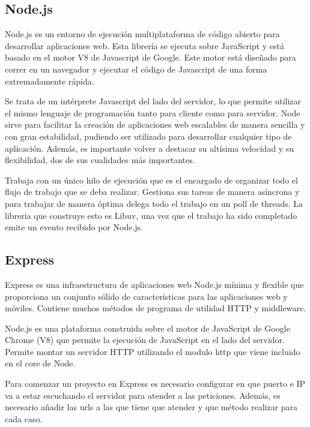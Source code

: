 \documentclass[a4paper, 12pt]{book}
\begin{document}
\subsection{Node.js}
\label{subsec:estilo}

Node.js es un entorno de ejecuci\'on multiplataforma de c\'odigo abierto para desarrollar aplicaciones
web. Esta librer\'ia se ejecuta sobre JavaScript y est\'a basado en el motor V8 de Javascript
de Google. Este motor est\'a dise\~nado para correr en un navegador y ejecutar el c\'odigo de 
Javascript de una forma extremadamente r\'apida.

Se trata de un int\'erprete Javascript del lado del servidor, lo que permite utilizar el mismo
lenguaje de programaci\'on tanto para cliente como para servidor.
Node sirve para facilitar la creaci\'on de aplicaciones web escalables de manera sencilla y con
gran estabilidad, pudiendo ser utilizado para desarrollar cualquier tipo de aplicaci\'on. Adem\'as,
es importante volver a destacar su alt\'isima velocidad y su flexibilidad, dos de sus cualidades
m\'as importantes.

Trabaja con un \'unico hilo de ejecuci\'on que es el encargado de organizar todo el flujo de
trabajo que se deba realizar. Gestiona sus tareas de manera as\'incrona y para trabajar de manera
\'optima delega todo el trabajo en un poll de threads. La libreria que construye esto es Libuv, una
vez que el trabajo ha sido completado emite un evento recibido por Node.js.



\subsection{Express}
\label{subsec:express}

Express es una infraestructura de aplicaciones web Node.js m\'inima y flexible que proporciona
un conjunto s\'olido de caracter\'isticas para las aplicaciones web y m\'oviles. Contiene muchos
m\'etodos de programa de utilidad HTTP y middleware.

Node.js es una plataforma construida sobre el motor de JavaScript de Google Chrome (V8)
que permite la ejecuci\'on de JavaScript en el lado del servidor. Permite montar un servidor HTTP
utilizando el modulo http que viene incluido en el core de Node.

Para comenzar un proyecto en Express es necesario configurar en que puerto e IP va a estar
escuchando el servidor para atender a las peticiones. Adem\'as, es necesario a\~nadir las urls a las
que tiene que atender y que m\'etodo realizar para cada caso.
\end{document}
